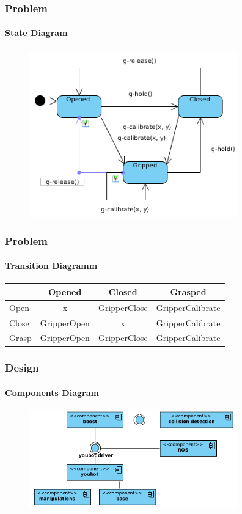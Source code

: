 \documentclass{beamer}
\begin{document}


\begin{frame}
 \frametitle{Problem}
 \framesubtitle{State Diagram}

 \begin{figure}[ht!]
  \centering
  \includegraphics[width=90mm]{img/statechart.png}
  \caption{}
  \label{State Diagram Of The Gripper}
  \end{figure} 
 \end{frame}
 
 
 \begin{frame}
 \frametitle{Problem}
 \framesubtitle{Transition Diagramm}
 \begin{tabular}{ l | c c c }
            & Opened & Closed & Grasped \\ \hline
  Open      & x & GripperClose & GripperCalibrate \\
  Close     & GripperOpen & x  & GripperCalibrate \\
  Grasp     & GripperOpen & GripperClose & GripperCalibrate \\
  
\end{tabular}

\end{frame}

\begin{frame}
 \frametitle{Design}
 \framesubtitle{Components Diagram}
  \begin{figure}[ht!]
  \centering
  \includegraphics[width=90mm]{img/components.png}
  \caption{}
  \label{Component Diagram}
  \end{figure} 
\end{frame}
\end{document}
